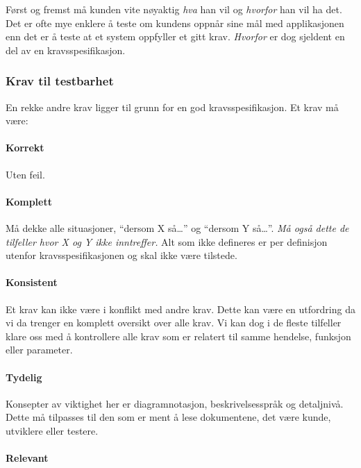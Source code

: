 Først og fremst må kunden vite nøyaktig \emph{hva} han vil og
\emph{hvorfor} han vil ha det. Det er ofte mye enklere å teste om
kundens oppnår sine mål med applikasjonen enn det er å teste at et
system oppfyller et gitt krav. \emph{Hvorfor} er dog sjeldent en del av
en kravsspesifikasjon.

\subsubsection{Krav til testbarhet}

En rekke andre krav ligger til grunn for en god kravsspesifikasjon. Et
krav må være:

\paragraph{Korrekt}

Uten feil.

\paragraph{Komplett}

Må dekke alle situasjoner, ``dersom X så\ldots{}'' og ``dersom Y
så\ldots{}''. \emph{Må også dette de tilfeller hvor X og Y ikke
inntreffer.} Alt som ikke defineres er per definisjon utenfor
kravsspesifikasjonen og skal ikke være tilstede.

\paragraph{Konsistent}

Et krav kan ikke være i konflikt med andre krav. Dette kan være en
utfordring da vi da trenger en komplett oversikt over alle krav. Vi kan
dog i de fleste tilfeller klare oss med å kontrollere alle krav som er
relatert til samme hendelse, funksjon eller parameter.

\paragraph{Tydelig}

Konsepter av viktighet her er diagramnotasjon, beskrivelsesspråk og
detaljnivå. Dette må tilpasses til den som er ment å lese dokumentene,
det være kunde, utviklere eller testere.

\paragraph{Relevant}

